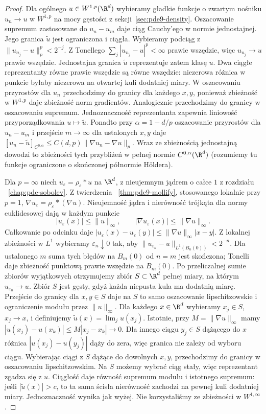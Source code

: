 \begin{proof}
Dla ogólnego $u\in W^{1,p}(\R^d)$ wybieramy
gładkie funkcje o zwartym nośniku $u_n\to u$ w $W^{1,p}$
na mocy gęstości z sekcji~\ref{sec:pde9-density}.
Oszacowanie supremum zastosowane do $u_n-u_m$ daje
ciąg Cauchy'ego w normie jednostajnej. Jego granica
$\widetilde u$ jest ograniczona i ciągła. Wybieramy
podciąg z $\|u_{n_j}-u\|_p^p<2^{-j}$. Z Tonellego
$\sum_j|u_{n_j}-u|^p<\infty$ prawie wszędzie, więc
$u_{n_j}\to u$ prawie wszędzie. Jednostajna granica
$\widetilde u$ reprezentuje zatem klasę $u$.
Dwa ciągłe reprezentanty równe prawie wszędzie są równe
wszędzie: niezerowa różnica w punkcie byłaby niezerowa
na otwartej kuli dodatniej miary.
W oszacowaniu przyrostów dla $u_n$ przechodzimy
do granicy dla każdego $x,y$, ponieważ zbieżność w
$W^{1,p}$ daje zbieżność norm gradientów. Analogicznie
przechodzimy do granicy w oszacowaniu supremum.
Jednoznaczność reprezentanta zapewnia liniowość
przyporządkowania $u\mapsto\widetilde u$.
Ponadto przy $\alpha=1-d/p$ oszacowanie przyrostów
dla $u_n-u_m$ i przejście $m\to\infty$ dla ustalonych
$x,y$ daje
$[u_n-\widetilde u]_{C^{0,\alpha}}
\le C(d,p)\|\nabla u_n-\nabla u\|_p$.
Wraz ze zbieżnością jednostajną dowodzi to zbieżności
tych przybliżeń w pełnej normie $C^{0,\alpha}(\R^d)$
(rozumiemy tu funkcje ograniczone o skończonej
półnormie Höldera).

Dla $p=\infty$ niech $u_\varepsilon=\rho_\varepsilon*u$
na $\R^d$, z nieujemnym jądrem o całce $1$ z rozdziału
~\ref{chap:pde-sobolev}. Z twierdzenia
~\ref{thm:pde9-mollify}, stosowanego lokalnie przy $p=1$,
$\nabla u_\varepsilon=\rho_\varepsilon*(\nabla u)$.
Nieujemność jądra i nierówność trójkąta dla normy
euklidesowej dają w każdym punkcie
\[
 |u_\varepsilon(x)|\le\|u\|_\infty,\qquad
 |\nabla u_\varepsilon(x)|\le\|\nabla u\|_\infty.
\]
Całkowanie po odcinku daje
$|u_\varepsilon(x)-u_\varepsilon(y)|
 \le\|\nabla u\|_\infty|x-y|$.
Z lokalnej zbieżności w $L^1$ wybieramy
$\varepsilon_n\downarrow0$ tak, aby
$\|u_{\varepsilon_n}-u\|_{L^1(B_n(0))}<2^{-n}$.
Dla ustalonego $m$ suma tych błędów na $B_m(0)$
od $n=m$ jest skończona; Tonelli daje zbieżność
punktową prawie wszędzie na $B_m(0)$.
Po przeliczalnej sumie zbiorów wyjątkowych otrzymujemy
zbiór $S\subset\R^d$ pełnej miary, na którym
$u_{\varepsilon_n}\to u$. Zbiór $S$ jest gęsty,
gdyż każda niepusta kula ma dodatnią miarę.
Przejście do granicy dla $x,y\in S$ daje na $S$
to samo oszacowanie lipschitzowskie i ograniczenie
modułu przez $\|u\|_\infty$. Dla każdego $x\in\R^d$
wybieramy $x_j\in S$, $x_j\to x$, i definiujemy
$\widetilde u(x)=\lim_j u(x_j)$.
Istotnie, przy $M=\|\nabla u\|_\infty$ mamy
$|u(x_j)-u(x_k)|\le M|x_j-x_k|\to0$.
Dla innego ciągu $y_j\in S$ dążącego do $x$ różnica
$|u(x_j)-u(y_j)|$ dąży do zera, więc granica
nie zależy od wyboru ciągu. Wybierając ciągi z $S$
dążące do dowolnych $x,y$, przechodzimy do granicy
w oszacowaniu lipschitzowskim. Na $S$ możemy wybrać
ciąg stały, więc reprezentant zgadza się z $u$.
Ciągłość daje równość supremum modułu i istotnego
supremum: jeśli $|\widetilde u(x)|>c$, to ta sama
ścisła nierówność zachodzi na pewnej kuli dodatniej
miary. Jednoznaczność wynika jak wyżej.
Nie korzystaliśmy ze zbieżności w $W^{1,\infty}$.
\end{proof}

